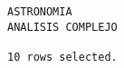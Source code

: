 \documentclass[11pt]{report}
\begin{document}
\begin{itemize}
\begin{verbatim}
ASTRONOMIA                                                                                                                                                                                                                                                                                                                                                                                                                                                                                                          
ANALISIS COMPLEJO                                                                                                                                                                                                                                                                                                                                                                                                                                                                                                   

10 rows selected.
  \end{verbatim}
\end{itemize}

\newpage

\end{document}
